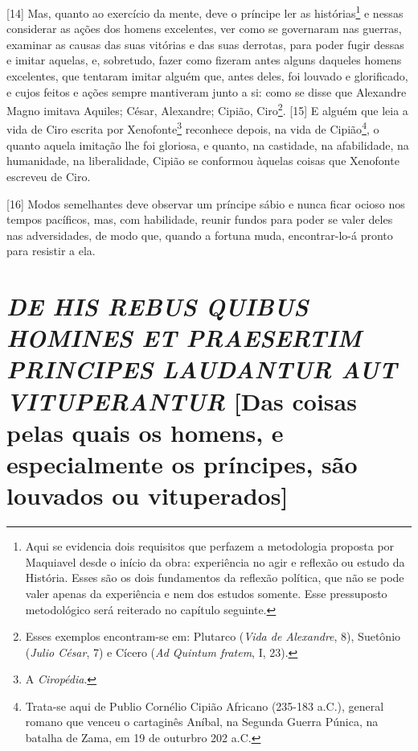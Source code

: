 {[}14{]} Mas, quanto ao exercício da mente, deve o príncipe ler as
histórias\footnote{Aqui se evidencia dois requisitos que perfazem a
  metodologia proposta por Maquiavel desde o início da obra: experiência
  no agir e reflexão ou estudo da História. Esses são os dois
  fundamentos da reflexão política, que não se pode valer apenas da
  experiência e nem dos estudos somente. Esse pressuposto metodológico
  será reiterado no capítulo seguinte.} e nessas considerar as ações dos
homens excelentes, ver como se governaram nas guerras, examinar as
causas das suas vitórias e das suas derrotas, para poder fugir dessas e
imitar aquelas, e, sobretudo, fazer como fizeram antes alguns daqueles
homens excelentes, que tentaram imitar alguém que, antes deles, foi
louvado e glorificado, e cujos feitos e ações sempre mantiveram junto a
si: como se disse que Alexandre Magno imitava Aquiles; César, Alexandre;
Cipião, Ciro\footnote{Esses exemplos encontram-se em: Plutarco
  (\emph{Vida de Alexandre}, 8), Suetônio (\emph{Julio César}, 7) e
  Cícero (\emph{Ad Quintum fratem}, I, 23).}. {[}15{]} E alguém que leia
a vida de Ciro escrita por Xenofonte\footnote{A \emph{Ciropédia}.}
reconhece depois, na vida de Cipião\footnote{Trata-se aqui de Publio
  Cornélio Cipião Africano (235-183 a.C.), general romano que venceu o
  cartaginês Aníbal, na Segunda Guerra Púnica, na batalha de Zama, em 19
  de outurbro 202 a.C.}, o quanto aquela imitação lhe foi gloriosa, e
quanto, na castidade, na afabilidade, na humanidade, na liberalidade,
Cipião se conformou àquelas coisas que Xenofonte escreveu de Ciro.

{[}16{]} Modos semelhantes deve observar um príncipe sábio e nunca ficar
ocioso nos tempos pacíficos, mas, com habilidade, reunir fundos para
poder se valer deles nas adversidades, de modo que, quando a fortuna
muda, encontrar-lo-á pronto para resistir a ela.

\quebra\section{\emph{DE HIS REBUS QUIBUS HOMINES ET PRAESERTIM PRINCIPES LAUDANTUR AUT
VITUPERANTUR}
{[}Das coisas pelas quais os homens, e especialmente os príncipes, são
louvados ou vituperados{]}}

